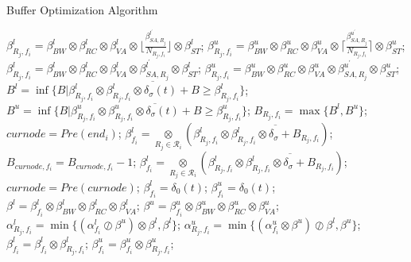 \documentclass[10pt,journal]{IEEEtran}
\begin{document}
\begin{algorithm}
\caption{Buffer Optimization Algorithm}
\label{alg:bufopt}
\begin{algorithmic}[1]
                \STATE $\beta_{R_j,f_i}^l=\beta_{BW}^l\otimes\beta_{RC}^l\otimes\beta_{VA}^l\otimes\lfloor\frac{\beta_{SA,R_j}^{l^\prime}}{N_{R_j,f_i}}\rfloor\otimes\beta_{ST}^l$;
                \STATE $\beta_{R_j,f_i}^u=\beta_{BW}^u\otimes\beta_{RC}^u\otimes\beta_{VA}^u\otimes\lceil\frac{\beta_{SA,R_j}^{u^\prime}}{N_{R_j,f_i}}\rceil\otimes\beta_{ST}^u$;
            \ELSE
                \STATE $\beta_{R_j,f_i}^l=\beta_{BW}^l\otimes\beta_{RC}^l\otimes\beta_{VA}^l\otimes\beta_{SA,R_j}^{l^\prime}\otimes\beta_{ST}^l$;
                \STATE $\beta_{R_j,f_i}^u=\beta_{BW}^u\otimes\beta_{RC}^u\otimes\beta_{VA}^u\otimes\beta_{SA,R_j}^{u^\prime}\otimes\beta_{ST}^u$;
            \ENDIF
            \STATE $B^l=\inf\{B|\beta_{R_j,f_i}^l\otimes\overline{\beta_{R_j,f_i}^l\otimes\delta_\sigma(t)+B}\geq\beta_{R_j,f_i}^l\}$;
            \STATE $B^u=\inf\{B|\beta_{R_j,f_i}^u\otimes\overline{\beta_{R_j,f_i}^u\otimes\delta_\sigma(t)+B}\geq\beta_{R_j,f_i}^u\}$;
            \STATE $B_{R_j,f_i}=\max\{B^l,B^u\}$;
        \ENDFOR
        \STATE $curnode=Pre(end_i)$;
            \STATE $\beta_{f_i}^l=\underset{R_{j}\in\mathcal{R}_i}{\otimes}(\beta^l_{R_j,f_i}\otimes\overline{\beta^l_{R_j,f_i}\otimes\delta_\sigma+B_{R_j,f_i}})$;
                \STATE $B_{curnode,f_i}=B_{curnode,f_i}-1$;
                \STATE $\beta_{f_i}^l=\underset{R_{j}\in\mathcal{R}_i}{\otimes}(\beta^l_{R_j,f_i}\otimes\overline{\beta^l_{R_j,f_i}\otimes\delta_\sigma+B_{R_j,f_i}})$;
            \ENDWHILE
            \STATE $curnode=Pre(curnode)$;
        \ENDWHILE
        \STATE $\beta_{f_i}^l=\delta_0(t)$; $\beta_{f_i}^u=\delta_0(t)$;
            \STATE $\beta^l=\beta^l_{f_i}\otimes\beta_{BW}^l\otimes\beta_{RC}^l\otimes\beta_{VA}^l$;
            \STATE $\beta^u=\beta^u_{f_i}\otimes\beta_{BW}^u\otimes\beta_{RC}^u\otimes\beta_{VA}^u$;
            \STATE $\alpha^l_{R_j,f_i}=\min\{(\alpha^l_{f_i}\oslash\beta^u)\otimes\beta^l,\beta^l\}$;
            \STATE $\alpha^u_{R_j,f_i}=\min\{(\alpha^u_{f_i}\otimes\beta^u)\oslash\beta^l,\beta^u\}$;
            \STATE $\beta_{f_i}^l=\beta_{f_i}^l\otimes\beta_{R_j,f_i}^l$; $\beta_{f_i}^u=\beta_{f_i}^u\otimes\beta_{R_j,f_i}^u$;

\end{algorithmic}
\end{algorithm}
\end{document}
